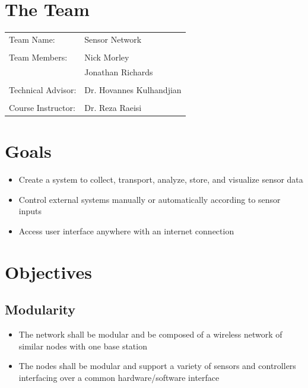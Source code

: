 

\graphicspath{{img/}}

  	
	
	\renewcommand*\contentsname{
		\begin{align*}
			\normalsize \textbf{TABLE OF CONTENTS}
		\end{align*}
		\noindent\makebox[\textwidth]{\normalsize \textbf{Section}\hfill \normalsize  \textbf{Page}}
	}
	\tableofcontents
	
	\newpage
	
	\section{The Team}
		\vfill
		\begin{tabular}{l l}
			Team Name:    & Sensor Network    \\
			\\
			Team Members: & Nick Morley       \\
			              & Jonathan Richards \\
			              \\
			Technical Advisor: & Dr. Hovannes Kulhandjian\\
			\\
			Course Instructor: & Dr. Reza Raeisi\\
		\end{tabular}
		 
	\section{Goals}
		\begin{itemize}
			\item Create a system to collect, transport, analyze, store, and visualize sensor data
			\item Control external systems manually or automatically according to sensor inputs
			\item Access user interface anywhere with an internet connection
		\end{itemize}
		
	\section{Objectives}
		\subsection{Modularity}
			\begin{itemize}
				\item The network shall be modular and be composed of a wireless network of similar nodes with one base station
				\item The nodes shall be modular and support a variety of sensors and controllers interfacing over a common hardware/software interface
			\end{itemize}
			
